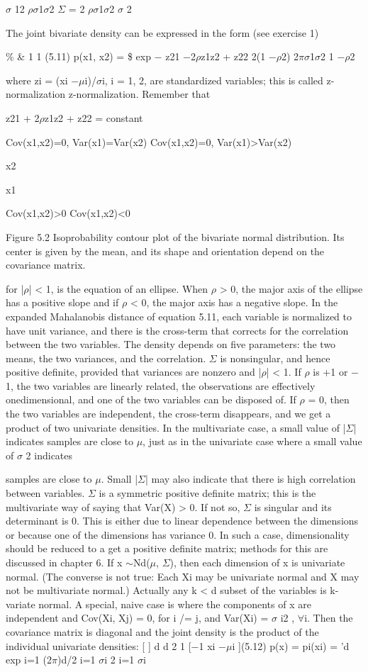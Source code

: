 $\sigma$ 12 $\rho$$\sigma$1$\sigma$2 $\Sigma$ = 2 $\rho$$\sigma$1$\sigma$2 $\sigma$ 2

The joint bivariate density can be expressed in the form (see exercise 1)

\% \& 1 1 (5.11) p(x1, x2) = \$ exp $-$ z21 $-$2$\rho$z1z2 + z22 2(1 $-$$\rho$2) 2$\pi$$\sigma$1$\sigma$2 1 $-$$\rho$2

where zi = (xi $-$$\mu$i)/$\sigma$i, i = 1, 2, are standardized variables; this is called z-normalization z-normalization. Remember that

z21 + 2$\rho$z1z2 + z22 = constant

Cov(x1,x2)=0, Var(x1)=Var(x2) Cov(x1,x2)=0, Var(x1)>Var(x2)

x2

x1

Cov(x1,x2)>0 Cov(x1,x2)<0

Figure 5.2 Isoprobability contour plot of the bivariate normal distribution. Its center is given by the mean, and its shape and orientation depend on the covariance matrix.

for |$\rho$| < 1, is the equation of an ellipse. When $\rho$ > 0, the major axis of the ellipse has a positive slope and if $\rho$ < 0, the major axis has a negative slope. In the expanded Mahalanobis distance of equation 5.11, each variable is normalized to have unit variance, and there is the cross-term that corrects for the correlation between the two variables. The density depends on five parameters: the two means, the two variances, and the correlation. $\Sigma$ is nonsingular, and hence positive definite, provided that variances are nonzero and |$\rho$| < 1. If $\rho$ is +1 or $-$1, the two variables are linearly related, the observations are effectively onedimensional, and one of the two variables can be disposed of. If $\rho$ = 0, then the two variables are independent, the cross-term disappears, and we get a product of two univariate densities. In the multivariate case, a small value of |$\Sigma$| indicates samples are close to $\mu$, just as in the univariate case where a small value of $\sigma$ 2 indicates

samples are close to $\mu$. Small |$\Sigma$| may also indicate that there is high correlation between variables. $\Sigma$ is a symmetric positive definite matrix; this is the multivariate way of saying that Var(X) > 0. If not so, $\Sigma$ is singular and its determinant is 0. This is either due to linear dependence between the dimensions or because one of the dimensions has variance 0. In such a case, dimensionality should be reduced to a get a positive definite matrix; methods for this are discussed in chapter 6. If x $\sim$Nd($\mu$, $\Sigma$), then each dimension of x is univariate normal. (The converse is not true: Each Xi may be univariate normal and X may not be multivariate normal.) Actually any k < d subset of the variables is k-variate normal. A special, naive case is where the components of x are independent and Cov(Xi, Xj) = 0, for i /= j, and Var(Xi) = $\sigma$ i2 , $\forall$i. Then the covariance matrix is diagonal and the joint density is the product of the individual univariate densities: [ ] d d 2 1 [$-$1 xi $-$$\mu$i ](5.12) p(x) = pi(xi) = 'd exp i=1 (2$\pi$)d/2 i=1 $\sigma$i 2 i=1 $\sigma$i

